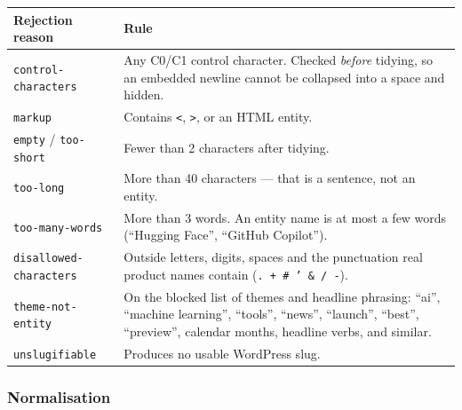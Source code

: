 \documentclass[11pt,a4paper]{article}
\newcommand{\brk}{\hyphenpenalty=0\exhyphenpenalty=0\relax}
\newcommand{\code}[1]{\texttt{\small\brk #1}}
\begin{document}
\begin{center}
\small
\begin{tabularx}{\textwidth}{@{}p{4.3cm} >{\RaggedRight}X@{}}
\toprule
\textbf{Rejection reason} & \textbf{Rule} \\
\midrule
\code{control-characters} & Any C0/C1 control character. Checked \emph{before}
  tidying, so an embedded newline cannot be collapsed into a space and hidden. \\
\code{markup} & Contains \code{<}, \code{>}, or an HTML entity. \\
\code{empty} / \code{too-short} & Fewer than 2 characters after tidying. \\
\code{too-long} & More than 40 characters --- that is a sentence, not an entity. \\
\code{too-many-words} & More than 3 words. An entity name is at most a few words
  (``Hugging Face'', ``GitHub Copilot''). \\
\code{disallowed-characters} & Outside letters, digits, spaces and the punctuation
  real product names contain (\code{. + \# ' \& / -}). \\
\code{theme-not-entity} & On the blocked list of themes and headline phrasing:
  ``ai'', ``machine learning'', ``tools'', ``news'', ``launch'', ``best'',
  ``preview'', calendar months, headline verbs, and similar. \\
\code{unslugifiable} & Produces no usable WordPress slug. \\
\bottomrule
\end{tabularx}
\end{center}

\subsubsection*{Normalisation}
\end{document}
